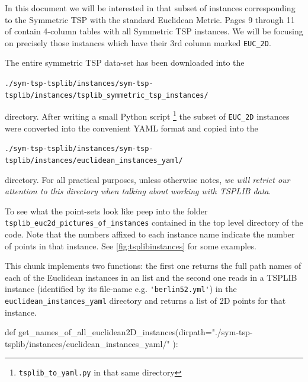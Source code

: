 In this document we will be interested in that subset of instances corresponding to the Symmetric TSP with the standard 
Euclidean Metric. Pages 9 through 11 of \cite{reinelt1991tsplib} contain 4-column tables with all Symmetric TSP instances. 
We will be focusing on precisely those instances which have their 3rd column marked \verb|EUC_2D|.  

The entire symmetric TSP data-set has been downloaded into the 

\begin{displayquote}
\texttt{./sym-tsp-tsplib/instances/sym-tsp-tsplib/instances/tsplib\_symmetric\_tsp\_instances/} 
\end{displayquote}

directory. 
After writing a small Python script \footnote{\texttt{tsplib\_to\_yaml.py} in that same directory} the subset of \verb|EUC_2D| instances
were converted into the convenient YAML format and copied into the 

\begin{displayquote}
\color{blue}
\texttt{./sym-tsp-tsplib/instances/sym-tsp-tsplib/instances/euclidean\_instances\_yaml/} 
\end{displayquote}
directory. For all practical purposes, unless otherwise notes, \textit{we will retrict our attention to this directory when talking about working with TSPLIB data}. 

To see what the point-sets look like peep into the folder \verb|tsplib_euc2d_pictures_of_instances| contained in the top level directory of the code. 
Note that the numbers affixed to each instance name indicate the number of points in that instance. See \autoref{fig:tsplibinstances} for some examples. 

This chunk implements two functions: the first one returns the full path names of each of the Euclidean instances in an list and  the second one
reads in a TSPLIB instance (identified by its file-name e.g. \verb|'berlin52.yml'|) in the \verb|euclidean_instances_yaml| directory 
and returns a list of 2D points for that instance. 

\nwenddocs{}\endmoddef\nwstartdeflinemarkup{}\nwenddeflinemarkup

def get_names_of_all_euclidean2D_instances(dirpath="./sym-tsp-tsplib/instances/euclidean_instances_yaml/" ):
     
